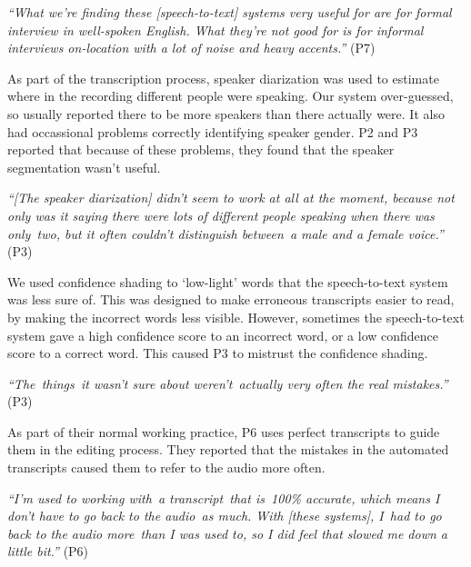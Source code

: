 \textit{``What we're finding these [speech-to-text] systems very useful for are for formal interview in well-spoken
English. What they're not good for is for informal interviews on-location with a lot of noise and heavy accents.''}
(P7)

As part of the transcription process, speaker diarization was used to estimate where in the recording different people
were speaking.  Our system over-guessed, so usually reported there to be more speakers than there actually were. It
also had occassional problems correctly identifying speaker gender. P2 and P3 reported that because of these problems,
they found that the speaker segmentation wasn't useful.

\textit{``[The speaker diarization] didn't seem to work at all at the moment, because not only was it saying there were
  lots of different people speaking when there was only two, but it often couldn't distinguish between a male and a
female voice.''} (P3)

We used confidence shading to `low-light' words that the speech-to-text system was less sure of. This was designed to
make erroneous transcripts easier to read, by making the incorrect words less visible.  However, sometimes the
speech-to-text system gave a high confidence score to an incorrect word, or a low confidence score to a correct word.
This caused P3 to mistrust the confidence shading.

\textit{``The things it wasn't sure about weren't actually very often the real mistakes.''} (P3)



As part of their normal working practice, P6 uses perfect transcripts to guide them in the editing process. They
reported that the mistakes in the automated transcripts caused them to refer to the audio more often.

\textit{``I'm used to working with a transcript that is 100\% accurate, which means I don't have to go back to the
  audio as much. With [these systems], I had to go back to the audio more than I was used to, so I did feel that slowed
me down a little bit.''} (P6)

